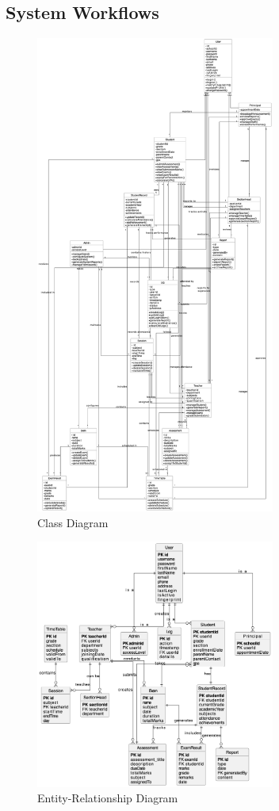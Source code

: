 \documentclass[12pt,a4paper]{report}
\begin{document}
\subsection{System Workflows}
\begin{figure}[h]
    \centering
    \includegraphics[width=0.7\textwidth]{class-diagram.png}
    \caption{Class Diagram}
    \label{fig:class-diagram}
\end{figure}

\begin{figure}[h]
    \centering
    \includegraphics[width=0.7\textwidth]{er-diagram.png}
    \caption{Entity-Relationship Diagram}
    \label{fig:er-diagram}
\end{figure}
\end{document}
